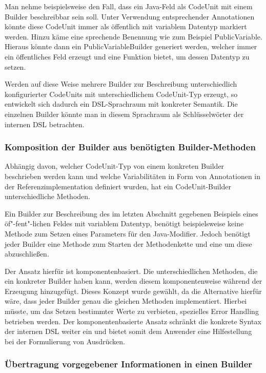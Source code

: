 \documentclass[12pt,oneside,a4paper,parskip]{scrbook}
\begin{document}
Man nehme beispielsweise den Fall, dass ein Java-Feld als CodeUnit mit einem Builder beschreibbar sein soll. Unter Verwendung entsprechender Annotationen könnte diese CodeUnit immer als öffentlich mit variablem Datentyp markiert werden. Hinzu käme eine sprechende Benennung wie zum Beispiel PublicVariable. Hieraus könnte dann ein PublicVariableBuilder generiert werden, welcher immer ein öffentliches Feld erzeugt und eine Funktion bietet, um dessen Datentyp zu setzen.

Werden auf diese Weise mehrere Builder zur Beschreibung unterschiedlich konfigurierter CodeUnits mit unterschiedlichem CodeUnit-Typ erzeugt, so entwickelt sich dadurch ein DSL-Sprachraum mit konkreter Semantik. Die einzelnen Builder könnte man in diesem Sprachraum als Schlüsselwörter der internen DSL betrachten.

\subsubsection{Komposition der Builder aus benötigten Builder-Methoden}

Abhängig davon, welcher CodeUnit-Typ von einem konkreten Builder beschrieben werden kann und welche Variabilitäten in Form von Annotationen in der Referenzimplementation definiert wurden, hat ein CodeUnit-Builder unterschiedliche Methoden.

Ein Builder zur Beschreibung des im letzten Abschnitt gegebenen Beispiels eines öf"-fent"-lichen Feldes mit variablem Datentyp, benötigt beispielsweise keine Methode zum Setzen eines Parameters für den Java-Modifier. Jedoch benötigt jeder Builder eine Methode zum Starten der Methodenkette und eine um diese abzuschließen.

Der Ansatz hierfür ist komponentenbasiert. Die unterschiedlichen Methoden, die ein konkreter Builder haben kann, werden diesem komponentenweise während der Erzeugung hinzugefügt. Dieses Konzept wurde gewählt, da die Alternative hierfür wäre, dass jeder Builder genau die gleichen Methoden implementiert. Hierbei müsste, um das Setzen bestimmter Werte zu verbieten, spezielles Error Handling betrieben werden. Der komponentenbasierte Ansatz schränkt die konkrete Syntax der internen DSL weiter ein und bietet somit dem Anwender eine Hilfestellung bei der Formulierung von Ausdrücken.

\subsubsection{Übertragung vorgegebener Informationen in einen Builder}
\end{document}
